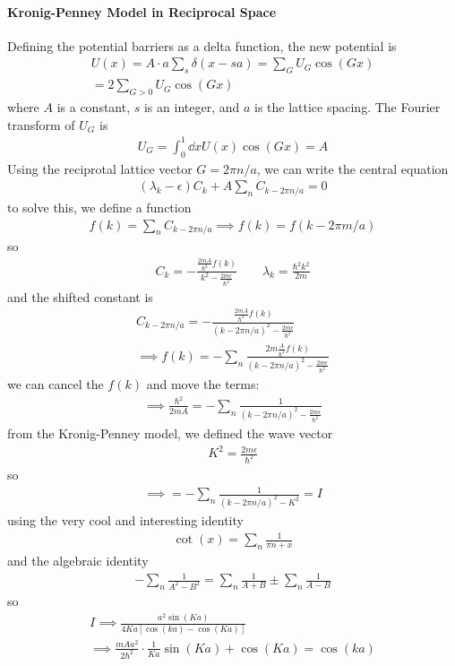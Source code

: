 \documentclass[../main.tex]{subfiles}
\begin{document}
\paragraph*{Kronig-Penney Model in Reciprocal Space} Defining the potential barriers as a delta 
function, the new potential is
\begin{align*}
    U(x) = A \cdot a \sum_s \delta(x - sa) = \sum_G U_G \cos(Gx) \\
    = 2 \sum_{G>0} U_G \cos(Gx)
\end{align*}
where $A$ is a constant, $s$ is an integer, and $a$ is the lattice spacing. The Fourier transform
of $U_G$ is
\begin{align*}
    U_G = \int_0^1 \dd x U(x) \cos(Gx) = A
\end{align*}
Using the reciprotal lattice vector $G = 2\pi n/a$, we can write the central equation
\begin{align*}
    (\lambda_k - \epsilon) C_k + A \sum_n C_{k - 2\pi n/a} = 0
\end{align*}
to solve this, we define a function
\begin{align*}
    f(k) = \sum_n C_{k - 2\pi n/a} \implies f(k) = f(k - 2\pi m/a)
\end{align*}
so
\begin{align*}
    C_k = -\frac{\frac{2mA}{\hbar^2} f(k)}{k^2 - \frac{2m\epsilon}{\hbar^2}}
        \qquad \lambda_k = \frac{\hbar^2 k^2}{2m}
\end{align*}
and the shifted constant is
\begin{align*}
    C_{k-2\pi n/a} = -\frac{\frac{2mA}{\hbar^2} f(k)}{(k-2\pi n/a)^2 - \frac{2m\epsilon}{\hbar^2}} \\
    \implies f(k) = -\sum_n \frac{2m\frac{A}{\hbar^2} f(k)}{(k-2\pi n/a)^2 - \frac{2m\epsilon}{\hbar^2}}
\end{align*}
we can cancel the $f(k)$ and move the terms:
\begin{align*}
    \implies \frac{\hbar^2}{2mA} = -\sum_n \frac{1}{(k-2\pi n/a)^2 - \frac{2m\epsilon}{\hbar^2}}
\end{align*}
from the Kronig-Penney model, we defined the wave vector
\begin{align*}
    K^2 = \frac{2m\epsilon}{\hbar^2}
\end{align*}
so 
\begin{align*}
    \implies = - \sum_n \frac{1}{(k-2\pi n/a)^2 - K^2} = I
\end{align*}
using the very cool and interesting identity
\begin{align*}
    \cot(x) = \sum_n \frac{1}{\pi n + x}
\end{align*}
and the algebraic identity
\begin{align*}
    -\sum_n \frac{1}{A^2 - B^2} = \sum_n \frac{1}{A + B} \pm \sum_n \frac{1}{A - B}
\end{align*}
so
\begin{align*}
    I \implies \frac{a^2\sin(Ka)}{4Ka[\cos(ka) - \cos(Ka)]} \\
    \implies \frac{mAa^2}{2\hbar^2} \cdot \frac{1}{Ka} \sin(Ka) + \cos(Ka) = \cos(ka)
\end{align*}
\end{document}

